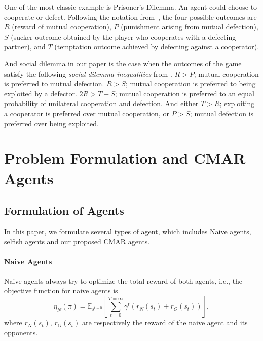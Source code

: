 \documentclass{article}
\begin{document}
One of the most classic example is Prisoner's Dilemma.
An agent could choose to cooperate or defect.
Following the notation from~\cite{macy2002learning, leibo2017multi},
the four possible outcomes are $R$ (reward of mutual cooperation),
$P$ (punishment arising from mutual defection),
$S$ (sucker outcome obtained by the player who cooperates with a defecting partner),
and $T$ (temptation outcome achieved by defecting against a cooperator).

And social dilemma in our paper is the case when the outcomes of the game
satisfy the following \emph{social dilemma inequalities} from \cite{macy2002learning}.
$R > P$; mutual cooperation is preferred to mutual defection.
$R > S$; mutual cooperation is preferred to being exploited by a defector.
$2R > T + S$;
mutual cooperation is preferred to an equal probability of unilateral cooperation and defection.
And either $T > R$; exploiting a cooperator is preferred over mutual cooperation,
or $P > S$; mutual defection is preferred over being exploited.

\section{Problem Formulation and CMAR Agents}


\subsection{Formulation of Agents}
In this paper, we formulate several types of agent, which includes Naive agents, selfish agents and our proposed CMAR agents.
\paragraph{Naive Agents}
Naive agents always try to optimize the total reward of both agents, i.e., the objective function for naive agents is
\begin{equation}\label{equation:naive_objective}
    \eta_N(\pi) =
    \mathbb{E}_{s^{t=0}}\left[\sum_{t=0}^{T=\infty}\gamma^t \left(r_N(s_t) + r_O(s_t)\right)\right],
\end{equation}
where \(r_N(s_t),\, r_O(s_t)\) are respectively the reward of the naive agent and its opponents.
\end{document}
